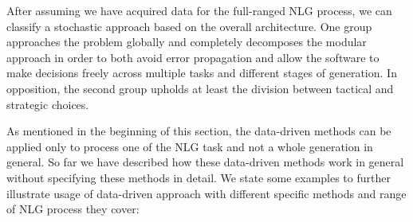 After assuming we have acquired data for the full-ranged NLG process, we can classify a stochastic approach based on the overall architecture. One group approaches the problem globally and completely decomposes the modular approach in order to both avoid error propagation and allow the software to make decisions freely across multiple tasks and different stages of generation. In opposition, the second group upholds at least the division between tactical and strategic choices.  

As mentioned in the beginning of this section, the data-driven methods can be applied only to process one of the NLG task and not a whole generation in general. So far we have described how these data-driven methods work in general without specifying these methods in detail. We state some examples to further illustrate usage of data-driven approach with different specific methods and range of NLG process they cover:
